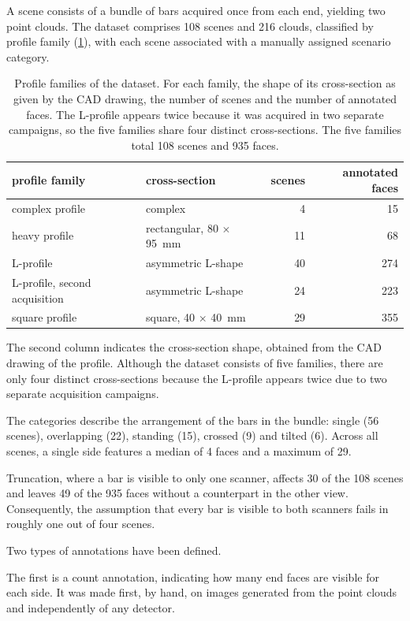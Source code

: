 \documentclass[a4paper, 12pt, twoside]{book}
\begin{document}
A scene consists of a bundle of bars acquired once from each end, yielding two point clouds. The dataset comprises 108 scenes and 216 clouds, classified by profile family (\cref{tab:families}), with each scene associated with a manually assigned scenario category.

\begin{table}[htbp]
\centering
\caption[Profile families of the dataset]{Profile families of the dataset. For each family, the shape of its cross-section as given by the CAD drawing, the number of scenes and the number of annotated faces. The L-profile appears twice because it was acquired in two separate campaigns, so the five families share four distinct cross-sections. The five families total 108 scenes and 935 faces.}
\label{tab:families}
\begin{tabular}{@{}llrr@{}}
\toprule
profile family & cross-section & scenes & annotated faces \\
\midrule
complex profile & complex & 4 & 15 \\
heavy profile & rectangular, 80 $\times$ 95~mm & 11 & 68 \\
L-profile & asymmetric L-shape & 40 & 274 \\
L-profile, second acquisition & asymmetric L-shape & 24 & 223 \\
square profile & square, 40 $\times$ 40~mm & 29 & 355 \\
\bottomrule
\end{tabular}
\end{table}

The second column indicates the cross-section shape, obtained from the CAD drawing of the profile. Although the dataset consists of five families, there are only four distinct cross-sections because the L-profile appears twice due to two separate acquisition campaigns.

The categories describe the arrangement of the bars in the bundle: single (56 scenes), overlapping (22), standing (15), crossed (9) and tilted (6). Across all scenes, a single side features a median of 4 faces and a maximum of 29.

Truncation, where a bar is visible to only one scanner, affects 30 of the 108 scenes and leaves 49 of the 935 faces without a counterpart in the other view. Consequently, the assumption that every bar is visible to both scanners fails in roughly one out of four scenes.

Two types of annotations have been defined.

The first is a count annotation, indicating how many end faces are visible for each side. It was made first, by hand, on images generated from the point clouds and independently of any detector.
\end{document}
